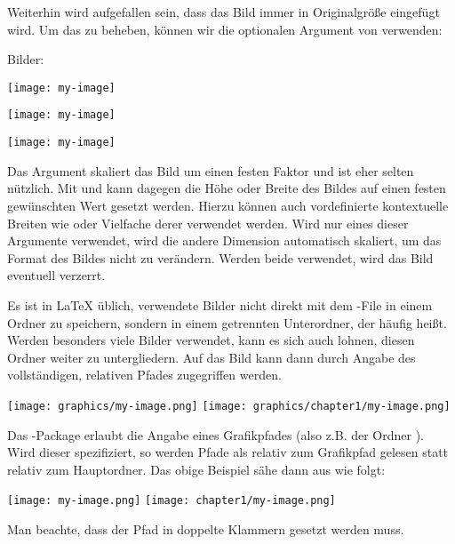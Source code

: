 Weiterhin wird aufgefallen sein, dass das Bild immer in Originalgröße eingefügt wird.
Um das zu beheben, können wir die optionalen Argument von  verwenden:
\begin{latexlisting}
	Bilder:

	\texttt{[image: my-image]}

	\texttt{[image: my-image]}

	\texttt{[image: my-image]}
\end{latexlisting}
Das Argument  skaliert das Bild um einen festen Faktor und ist eher selten nützlich.
Mit  und  kann dagegen die Höhe oder Breite des Bildes auf einen festen gewünschten Wert gesetzt werden.
Hierzu können auch vordefinierte kontextuelle Breiten wie  oder Vielfache derer verwendet werden.
Wird nur eines dieser Argumente verwendet, wird die andere Dimension automatisch skaliert, um das Format des Bildes nicht zu verändern.
Werden beide verwendet, wird das Bild eventuell verzerrt.

Es ist in \LaTeX{} üblich, verwendete Bilder nicht direkt mit dem -File in einem Ordner zu speichern, sondern in einem getrennten Unterordner, der häufig  heißt.
Werden besonders viele Bilder verwendet, kann es sich auch lohnen, diesen Ordner weiter zu untergliedern.
Auf das Bild kann dann durch Angabe des vollständigen, relativen Pfades zugegriffen werden.
\begin{latexlisting}
	\texttt{[image: graphics/my-image.png]}
	\texttt{[image: graphics/chapter1/my-image.png]}
\end{latexlisting}
Das -Package erlaubt die Angabe eines Grafikpfades (also z.B. der Ordner ).
Wird dieser spezifiziert, so werden Pfade als relativ zum Grafikpfad gelesen statt relativ zum Hauptordner.
Das obige Beispiel sähe dann aus wie folgt:
\begin{latexlisting}
	\graphicspath{{graphics}}
	\texttt{[image: my-image.png]}
	\texttt{[image: chapter1/my-image.png]}
\end{latexlisting}
Man beachte, dass der Pfad in doppelte Klammern gesetzt werden muss.

